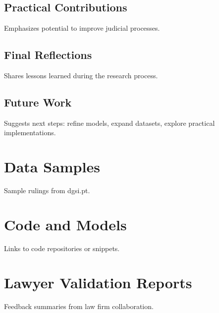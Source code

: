 \documentclass[11pt,a4paper,twoside,openright]{book}
\begin{document}
\section{Practical Contributions}
Emphasizes potential to improve judicial processes.
\section{Final Reflections}
Shares lessons learned during the research process.
\section{Future Work}
Suggests next steps: refine models, expand datasets, explore practical implementations.

\backmatter
\printbibliography[title={References}]

\begin{appendices}
\chapter{Data Samples}
Sample rulings from dgsi.pt.
\chapter{Code and Models}
Links to code repositories or snippets.
\chapter{Lawyer Validation Reports}
Feedback summaries from law firm collaboration.
\end{appendices}
\end{document}
